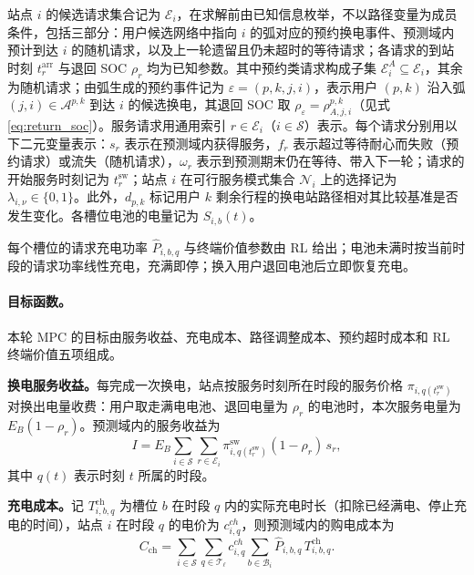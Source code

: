 \documentclass[12pt,a4paper,UTF8]{ctexart}
\begin{document}
站点 $i$ 的候选请求集合记为 $\mathcal E_i$，在求解前由已知信息枚举，不以路径变量为成员条件，包括三部分：用户候选网络中指向 $i$ 的弧对应的预约换电事件、预测域内预计到达 $i$ 的随机请求，以及上一轮遗留且仍未超时的等待请求；各请求的到站时刻 $t_r^{\mathrm{arr}}$ 与退回 SOC $\rho_r$ 均为已知参数。其中预约类请求构成子集 $\mathcal E_i^A\subseteq\mathcal E_i$，其余为随机请求；由弧生成的预约事件记为 $\varepsilon=(p,k,j,i)$，表示用户 $(p,k)$ 沿入弧 $(j,i)\in\mathcal A^{p,k}$ 到达 $i$ 的候选换电，其退回 SOC 取 $\rho_\varepsilon=\rho_{A,j,i}^{p,k}$（见式 \eqref{eq:return_soc}）。服务请求用通用索引 $r\in\mathcal E_i$（$i\in\mathcal S$）表示。每个请求分别用以下二元变量表示：$s_r$ 表示在预测域内获得服务，$f_r$ 表示超过等待耐心而失败（预约请求）或流失（随机请求），$\omega_r$ 表示到预测期末仍在等待、带入下一轮；请求的开始服务时刻记为 $t_r^{\mathrm{sw}}$；站点 $i$ 在可行服务模式集合 $\mathcal N_i$ 上的选择记为 $\lambda_{i,\nu}\in\{0,1\}$。此外，$d_{p,k}$ 标记用户 $k$ 剩余行程的换电站路径相对其比较基准是否发生变化。各槽位电池的电量记为 $S_{i,b}(t)$。

每个槽位的请求充电功率 $\widehat P_{i,b,q}$ 与终端价值参数由 RL 给出；电池未满时按当前时段的请求功率线性充电，充满即停；换入用户退回电池后立即恢复充电。

\paragraph{目标函数。}
本轮 MPC 的目标由服务收益、充电成本、路径调整成本、预约超时成本和 RL 终端价值五项组成。

\textbf{换电服务收益。}每完成一次换电，站点按服务时刻所在时段的服务价格 $\pi_{i,q(t_r^{\mathrm{sw}})}$ 对换出电量收费：用户取走满电电池、退回电量为 $\rho_r$ 的电池时，本次服务电量为 $E_B(1-\rho_r)$。预测域内的服务收益为
\begin{equation}
I
=E_B\sum_{i\in\mathcal S}
\sum_{r\in\mathcal E_i}
\pi_{i,q(t_r^{\mathrm{sw}})}^{\mathrm{sw}}(1-\rho_r)\,s_r,
\label{eq:income}
\end{equation}
其中 $q(t)$ 表示时刻 $t$ 所属的时段。

\textbf{充电成本。}记 $T_{i,b,q}^{\mathrm{ch}}$ 为槽位 $b$ 在时段 $q$ 内的实际充电时长（扣除已经满电、停止充电的时间），站点 $i$ 在时段 $q$ 的电价为 $c^{ch}_{i,q}$，则预测域内的购电成本为
\begin{equation}
C_{\mathrm{ch}}
=
\sum_{i\in\mathcal S}
\sum_{q\in\mathcal T_\ell}
c^{ch}_{i,q}
\sum_{b\in\mathcal B_i}
\widehat P_{i,b,q}\,T_{i,b,q}^{\mathrm{ch}}.
\label{eq:chargingcost}
\end{equation}
\end{document}
